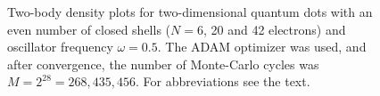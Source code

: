 \begin{figure}
	\hspace{0.1cm}
	
	\caption{Two-body density plots for two-dimensional quantum dots with an even number of closed shells ($N=6$, 20 and 42 electrons) and oscillator frequency $\omega=0.5$. The ADAM optimizer was used, and after convergence, the number of Monte-Carlo cycles was $M=2^{28}=268,435,456$. For abbreviations see the text.}%
	\label{fig:TB_interaction_20P}
\end{figure}

